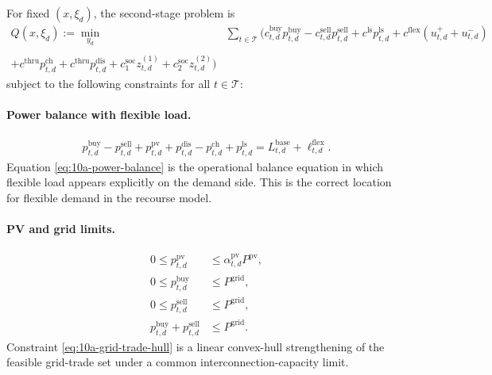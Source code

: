 For fixed \((x,\xi_d)\), the second-stage problem is
\begin{align}
Q(x,\xi_d) := \min_{y_d} \quad & \sum_{t\in\mathcal{T}} \Big(c^{\mathrm{buy}}_{t,d} p^{\mathrm{buy}}_{t,d} - c^{\mathrm{sell}}_{t,d} p^{\mathrm{sell}}_{t,d} + c^{\mathrm{ls}} p^{\mathrm{ls}}_{t,d} + c^{\mathrm{flex}}(u^+_{t,d}+u^-_{t,d}) \\
&\qquad\\ + c^{\mathrm{thru}} p^{\mathrm{ch}}_{t,d} + c^{\mathrm{thru}} p^{\mathrm{dis}}_{t,d} + c^{\mathrm{soc}}_1 z^{(1)}_{t,d} + c^{\mathrm{soc}}_2 z^{(2)}_{t,d}\Big)
\label{eq:10a-second-stage-obj}
\end{align}
subject to the following constraints for all \(t\in\mathcal{T}\):

\paragraph{Power balance with flexible load.}
\begin{align}
p^{\mathrm{buy}}_{t,d} - p^{\mathrm{sell}}_{t,d} + p^{\mathrm{pv}}_{t,d} + p^{\mathrm{dis}}_{t,d} - p^{\mathrm{ch}}_{t,d} + p^{\mathrm{ls}}_{t,d}
= L^{\mathrm{base}}_{t,d} + \ell^{\mathrm{flex}}_{t,d}.
\label{eq:10a-power-balance}
\end{align}
Equation \eqref{eq:10a-power-balance} is the operational balance equation in which flexible load appears explicitly on the demand side. This is the correct location for flexible demand in the recourse model.

\paragraph{PV and grid limits.}
\begin{align}
0 \le p^{\mathrm{pv}}_{t,d} &\le \alpha^{\mathrm{pv}}_{t,d} P^{\mathrm{pv}},
\label{eq:10a-pv-limit}\\
0 \le p^{\mathrm{buy}}_{t,d} &\le P^{\mathrm{grid}},
\label{eq:10a-grid-import-limit}\\
0 \le p^{\mathrm{sell}}_{t,d} &\le P^{\mathrm{grid}},
\label{eq:10a-grid-export-limit}\\
p^{\mathrm{buy}}_{t,d} + p^{\mathrm{sell}}_{t,d} &\le P^{\mathrm{grid}}.
\label{eq:10a-grid-trade-hull}
\end{align}
Constraint \eqref{eq:10a-grid-trade-hull} is a linear convex-hull strengthening of the feasible grid-trade set under a common interconnection-capacity limit.

